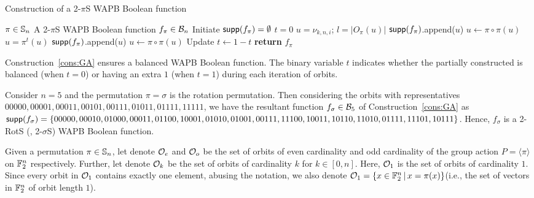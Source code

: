 \documentclass{llncs}
\begin{document}
\begin{constr}
\caption{Construction of a 2-$\pi$S WAPB Boolean function\label{cons:GA}}
\begin{algorithmic}
\Require $\pi \in \mathbb{S}_n$ %
\Ensure A 2-$\pi$S WAPB Boolean function $f_\pi \in \mathcal{B}_n$
\State Initiate $\mathsf{supp}(f_\pi) = \emptyset$
\State $t = 0$
		\State $u = \nu_{k,n,i}$; $l= |O_\pi(u)|$
				\State $\mathsf{supp}(f_\pi)$.append($u$)
				\State $ u \gets \pi \circ \pi(u)$
			\EndFor
		\Else
			\State $u = \pi^{t}(u)$
				\State $\mathsf{supp}(f_\pi)$.append($u$)
				\State $ u \gets \pi \circ \pi(u)$ 
			\EndFor 
			\State Update $t \gets 1 - t$
		\EndIf
	\EndFor
\EndFor
\State \textbf{return} $f_\pi$
\end{algorithmic}

\end{constr}
Construction~\ref{cons:GA} ensures a balanced WAPB Boolean function. 
The binary variable $t$ indicates whether the partially constructed is balanced (when $t = 0$) or having an extra $1$ (when $t = 1$) during each iteration of orbits.
\begin{example}
Consider $n = 5$ and the permutation $\pi = \sigma$ is the rotation permutation. Then considering the orbits with representatives $00000, 00001, 00011, 00101, 00111, 01011, 01111, 11111$, we have the resultant function $f_{\sigma} \in \mathcal{B}_{5}$ of Construction~\ref{cons:GA} as $\mathsf{supp}(f_{\sigma}) = \{00000, 00010, 01000, 00011, 01100, 10001, 01010, 01001, 00111,\\ 11100, 10011, 10110, 11010, 01111, 11101, 10111\}$.
Hence, $f_{\sigma}$ is a 2-RotS (\ie, 2-$\sigma$S) WAPB Boolean function.
\end{example}

Given a permutation $\pi \in \mathbb{S}_n$, let denote $\mathcal{O}_e$ and $\mathcal{O}_o$ be the set of orbits of even cardinality and  odd cardinality of the group action $P = \langle \pi \rangle$ on $\mathbb{F}_2^n$ respectively. Further, let denote $\mathcal{O}_k$ be the set of orbits of cardinality $k$ for $k \in [0,n]$. Here, $\mathcal{O}_1$ is the set of orbits of cardinality $1$. Since every orbit in $\mathcal{O}_1$ contains exactly one element, abusing the notation, we also denote $\mathcal{O}_1 = \{x \in \mathbb{F}_2^n \, | \, x = \pi(x)\}$(i.e.,  the set of vectors in $\mathbb{F}_2^n$ of orbit length $1$).
\end{document}
